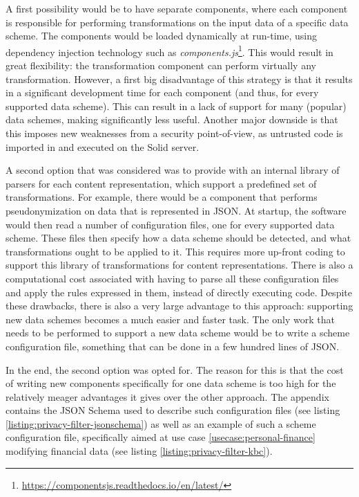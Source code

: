 A first possibility would be to have separate components, where each component is responsible for performing transformations on the input data of a specific data scheme. The components would be loaded dynamically at run-time, using dependency injection technology such as \textit{components.js}\footnote{\url{https://componentsjs.readthedocs.io/en/latest/}}. This would result in great flexibility: the transformation component can perform virtually any transformation. However, a first big disadvantage of this strategy is that it results in a significant development time for each component (and thus, for every supported data scheme). This can result in a lack of support for many (popular) data schemes, making \middleware{} significantly less useful. Another major downside is that this imposes new weaknesses from a security point-of-view, as untrusted code is imported in and executed on the Solid server.

A second option that was considered was to provide \middleware{} with an internal library of parsers for each content representation, which support a predefined set of transformations. For example, there would be a component that performs pseudonymization on data that is represented in JSON. At startup, the software would then read a number of configuration files, one for every supported data scheme. These files then specify how a data scheme should be detected, and what transformations ought to be applied to it. This requires more up-front coding to support this library of transformations for content representations. There is also a computational cost associated with having to parse all these configuration files and apply the rules expressed in them, instead of directly executing code. Despite these drawbacks, there is also a very large advantage to this approach: supporting new data schemes becomes a much easier and faster task. The only work that needs to be performed to support a new data scheme would be to write a scheme configuration file, something that can be done in a few hundred lines of JSON.

In the end, the second option was opted for. The reason for this is that the cost of writing new components specifically for one data scheme is too high for the relatively meager advantages it gives over the other approach. The appendix contains the JSON Schema used to describe such configuration files (see listing \ref{listing:privacy-filter-jsonschema}) as well as an example of such a scheme configuration file, specifically aimed at use case \ref{usecase:personal-finance} modifying financial data (see listing \ref{listing:privacy-filter-kbc}).

